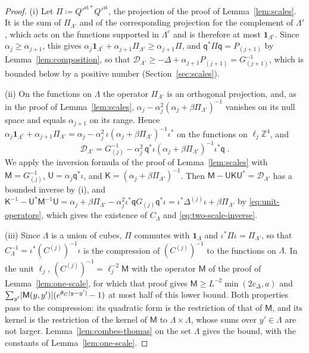 \documentclass[11pt]{preprint}
\DeclarePairedDelimiter{\abs}{\lvert}{\rvert}
\numberwithin{equation}{section}
\theoremstyle{definition}
\theoremstyle{remark}
\theoremstyle{plain}
\begin{document}
\begin{proof}
(i) Let $\Pi \coloneqq Q'^{\mathrm{st}*}Q'^{\mathrm{st}}$, the projection of the proof of Lemma~\ref{lem:scales}. It is the sum of $\Pi_{\Lambda'}$ and of the corresponding projection for the complement of $\Lambda'$, which acts on the functions supported in $\Lambda^c$ and is therefore at most $\mathbf 1_{\Lambda^c}$. Since $\alpha_j \geq \alpha_{j+1}$, this gives $\alpha_j\mathbf 1_{\Lambda^c} + \alpha_{j+1}\Pi_{\Lambda'} \geq \alpha_{j+1}\Pi$, and $\mathsf q^*\Pi\mathsf q = P_{(j+1)}$ by Lemma~\ref{lem:composition}, so that $\mathcal D_{\Lambda'} \geq -\Delta + \alpha_{j+1}P_{(j+1)} = G_{(j+1)}^{-1}$, which is bounded below by a positive number (Section~\ref{sec:scales}).

(ii) On the functions on $\Lambda$ the operator $\Pi_{\Lambda'}$ is an orthogonal projection, and, as in the proof of Lemma~\ref{lem:scales}, $\alpha_j - \alpha_j^2(\alpha_j + \beta\Pi_{\Lambda'})^{-1}$ vanishes on its null space and equals $\alpha_{j+1}$ on its range. Hence $\alpha_j\mathbf 1_{\Lambda^c} + \alpha_{j+1}\Pi_{\Lambda'} = \alpha_j - \alpha_j^2\,\iota(\alpha_j + \beta\Pi_{\Lambda'})^{-1}\iota^*$ on the functions on $\ell_j\mathbb Z^4$, and
\begin{equation}\label{eq:two-scale-schur}
    \mathcal D_{\Lambda'} = G_{(j)}^{-1} - \alpha_j^2\,\mathsf q^*\iota(\alpha_j + \beta\Pi_{\Lambda'})^{-1}\iota^*\mathsf q\;.
\end{equation}
We apply the inversion formula of the proof of Lemma~\ref{lem:scales} with $\mathsf M = G_{(j)}^{-1}$, $\mathsf U = \alpha_j\mathsf q^*\iota$, and $\mathsf K = (\alpha_j + \beta\Pi_{\Lambda'})^{-1}$. Then $\mathsf M - \mathsf U\mathsf K\mathsf U^* = \mathcal D_{\Lambda'}$ has a bounded inverse by (i), and $\mathsf K^{-1} - \mathsf U^*\mathsf M^{-1}\mathsf U = \alpha_j + \beta\Pi_{\Lambda'} - \alpha_j^2\iota^*\mathsf qG_{(j)}\mathsf q^*\iota = \iota^*\Delta^{(j)}\iota + \beta\Pi_{\Lambda'}$ by \eqref{eq:unit-operators}, which gives the existence of $C_\Lambda$ and \eqref{eq:two-scale-inverse}.

(iii) Since $\Lambda$ is a union of cubes, $\Pi$ commutes with $\mathbf 1_\Lambda$ and $\iota^*\Pi\iota = \Pi_{\Lambda'}$, so that $C_\Lambda^{-1} = \iota^*(C^{(j)})^{-1}\iota$ is the compression of $(C^{(j)})^{-1}$ to the functions on $\Lambda$. In the unit $\ell_j$, $(C^{(j)})^{-1} = \ell_j^{-2}\mathsf M$ with the operator $\mathsf M$ of the proof of Lemma~\ref{lem:one-scale}, for which that proof gives $\mathsf M \geq L^{-2}\min(2c_\Delta, a)$ and $\sum_{y'}\abs{\mathsf M(y, y')}(e^{\theta_C\abs{y - y'}} - 1)$ at most half of this lower bound. Both properties pass to the compression: its quadratic form is the restriction of that of $\mathsf M$, and its kernel is the restriction of the kernel of $\mathsf M$ to $\Lambda \times \Lambda$, whose sums over $y' \in \Lambda$ are not larger. Lemma~\ref{lem:combes-thomas} on the set $\Lambda$ gives the bound, with the constants of Lemma~\ref{lem:one-scale}.


\end{proof}
\end{document}
